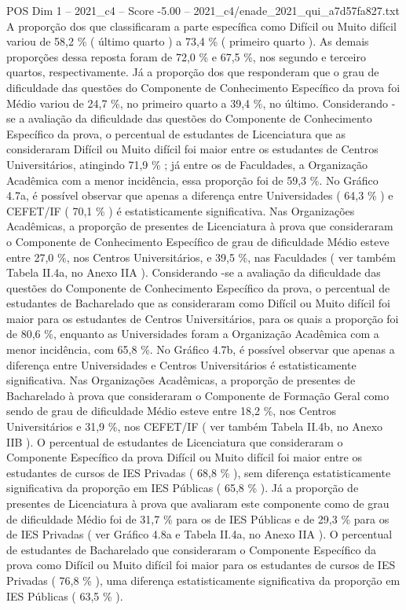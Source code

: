 \begin{textsample}{POS Dim 1 – 2021\_c4 – Score -5.00 – 2021\_c4/enade\_2021\_qui\_a7d57fa827.txt}
A proporção dos que classificaram a parte específica como Difícil ou Muito difícil variou de 58,2 \% ( último quarto ) a 73,4 \% ( primeiro quarto ).
As demais proporções dessa reposta foram de 72,0 \% e 67,5 \%, nos segundo e terceiro quartos, respectivamente.
Já a proporção dos que responderam que o grau de dificuldade das questões do Componente de Conhecimento Específico da prova foi Médio variou de 24,7 \%, no primeiro quarto a 39,4 \%, no último.
Considerando -se a avaliação da dificuldade das questões do Componente de Conhecimento Específico da prova, o percentual de estudantes de Licenciatura que as consideraram Difícil ou Muito difícil foi maior entre os estudantes de Centros Universitários, atingindo 71,9 \% ; já entre os de Faculdades, a Organização Acadêmica com a menor incidência, essa proporção foi de 59,3 \%.
No Gráfico 4.7a, é possível observar que apenas a diferença entre Universidades ( 64,3 \% ) e CEFET/IF ( 70,1 \% ) é estatisticamente significativa.
Nas Organizações Acadêmicas, a proporção de presentes de Licenciatura à prova que consideraram o Componente de Conhecimento Específico de grau de dificuldade Médio esteve entre 27,0 \%, nos Centros Universitários, e 39,5 \%, nas Faculdades ( ver também Tabela II.4a, no Anexo IIA ).
Considerando -se a avaliação da dificuldade das questões do Componente de Conhecimento Específico da prova, o percentual de estudantes de Bacharelado que as consideraram como Difícil ou Muito difícil foi maior para os estudantes de Centros Universitários, para os quais a proporção foi de 80,6 \%, enquanto as Universidades foram a Organização Acadêmica com a menor incidência, com 65,8 \%.
No Gráfico 4.7b, é possível observar que apenas a diferença entre Universidades e Centros Universitários é estatisticamente significativa.
Nas Organizações Acadêmicas, a proporção de presentes de Bacharelado à prova que consideraram o Componente de Formação Geral como sendo de grau de dificuldade Médio esteve entre 18,2 \%, nos Centros Universitários e 31,9 \%, nos CEFET/IF ( ver também Tabela II.4b, no Anexo IIB ).
O percentual de estudantes de Licenciatura que consideraram o Componente Específico da prova Difícil ou Muito difícil foi maior entre os estudantes de cursos de IES Privadas ( 68,8 \% ), sem diferença estatisticamente significativa da proporção em IES Públicas ( 65,8 \% ).
Já a proporção de presentes de Licenciatura à prova que avaliaram este componente como de grau de dificuldade Médio foi de 31,7 \% para os de IES Públicas e de 29,3 \% para os de IES Privadas ( ver Gráfico 4.8a e Tabela II.4a, no Anexo IIA ).
O percentual de estudantes de Bacharelado que consideraram o Componente Específico da prova como Difícil ou Muito difícil foi maior para os estudantes de cursos de IES Privadas ( 76,8 \% ), uma diferença estatisticamente significativa da proporção em IES Públicas ( 63,5 \% ).

\end{textsample}
